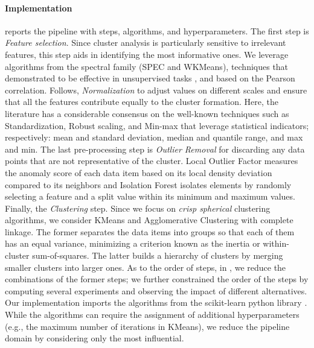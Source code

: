 \paragraph{Implementation}  reports the pipeline with steps, algorithms, and hyperparameters.
The first step is \textit{Feature selection}.
Since cluster analysis is particularly sensitive to irrelevant features, this step aids in identifying the most informative ones.
We leverage algorithms from the spectral family (SPEC and WKMeans), techniques that demonstrated to be effective in unsupervised tasks \cite{alelyani2018feature}, and based on the Pearson correlation.
Follows, \textit{Normalization} to adjust values on different scales and ensure that all the features contribute equally to the cluster formation.
Here, the literature has a considerable consensus on the well-known techniques such as Standardization, Robust scaling, and Min-max that leverage statistical indicators; respectively: mean and standard deviation, median and quantile range, and max and min.
The last pre-processing step is \textit{Outlier Removal} for discarding any data points that are not representative of the cluster.
Local Outlier Factor \cite{breunig2000lof} measures the anomaly score of each data item based on its local density deviation compared to its neighbors and Isolation Forest \cite{liu2012isolation} isolates elements by randomly selecting a feature and a split value within its minimum and maximum values.
Finally, the \textit{Clustering} step.
Since we focus on \textit{crisp spherical} clustering algorithms, we consider KMeans \cite{arthur2006k} and Agglomerative Clustering \cite{murtagh2017algorithms} with complete linkage.
The former separates the data items into groups so that each of them has an equal variance, minimizing a criterion known as the inertia or within-cluster sum-of-squares.
The latter builds a hierarchy of clusters by merging smaller clusters into larger ones.
As to the order of steps, in , we reduce the combinations of the former steps; we further constrained the order of the steps by computing several experiments and observing the impact of different alternatives.
Our implementation imports the algorithms from the scikit-learn python library \cite{scikit-learn}.
While the algorithms can require the assignment of additional hyperparameters (e.g., the maximum number of iterations in KMeans), we reduce the pipeline domain by considering only the most influential.

